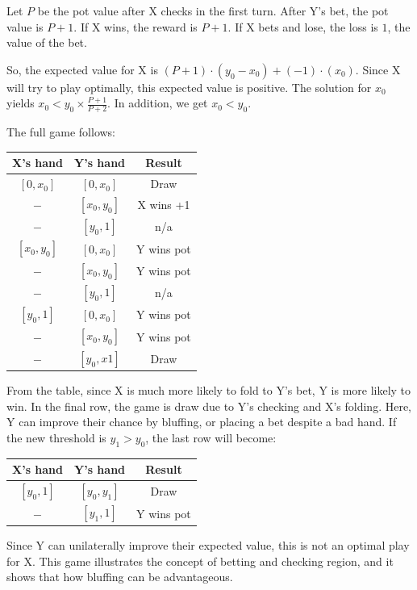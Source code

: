 \documentclass[12pt]{article}
\begin{document}
Let $P$ be the pot value after X checks in the first turn. After Y's bet, the pot value is $P+1$. If X wins, the reward is $P+1$. If X bets and lose, the loss is $1$, the value of the bet. 

So, the expected value for X is $(P+1)\cdot(y_0-x_0) + (-1) \cdot (x_0)$. Since X will try to play optimally, this expected value is positive. The solution for $x_0$ yields $x_0 < y_0\times \frac{P+1}{P+2}$. In addition, we get $x_0 < y_0$.

The full game follows:
\begin{center}
\begin{tabular}{|c|c|c|}
    \hline
     X's hand & Y's hand & Result \\
     \hline
     $[0,x_0]$ & $[0,x_0]$ & Draw\\
     \hline
     $-$& $[x_0, y_0]$ & X wins +1\\
    \hline
     $-$& $[y_0, 1]$ & n/a \\
    \hline
     $[x_0, y_0]$& $[0, x_0]$ & Y wins pot\\
    \hline
     $-$& $[x_0, y_0]$ & Y wins pot\\
    \hline
     $-$& $[y_0, 1]$ & n/a\\
    \hline
     $[y_0, 1]$& $[0, x_0]$ & Y wins pot\\
    \hline
     $-$& $[x_0, y_0]$ & Y wins pot\\
    \hline
     $-$& $[y_0, x1]$ & Draw\\
    \hline
\end{tabular}
\end{center}
From the table, since X is much more likely to fold to Y's bet, Y is more likely to win. In the final row, the game is draw due to Y's checking and X's folding. Here, Y can improve their chance by bluffing, or placing a bet despite a bad hand. If the new threshold is $y_1 > y_0$, the last row will become: 

\begin{center}
    \begin{tabular}{|c|c|c|}
        \hline
        X's hand & Y's hand & Result \\
        \hline
         $[y_0, 1]$& $[y_0, y_1]$ & Draw \\
         \hline
         $-$ & $[y_1, 1]$ & Y wins pot \\
         \hline \end{tabular}
\end{center}

Since Y can unilaterally improve their expected value, this is not an optimal play for X. This game illustrates the concept of betting and checking region, and it shows that how bluffing can be advantageous.
\end{document}
